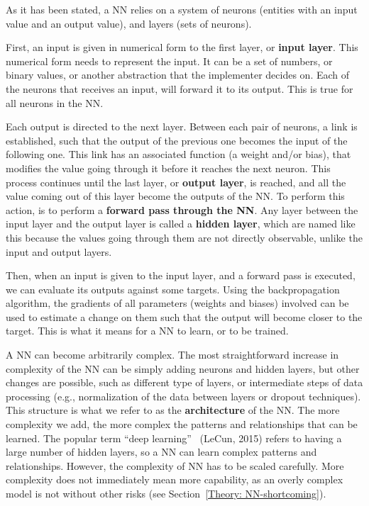 \documentclass[a4paper, 11pt]{report}
\begin{document}
As it has been stated, a NN relies on a system of neurons (entities with an input value and an output value), and layers (sets of neurons).

First, an input is given in numerical form to the first layer, or \textbf{input layer}. This numerical form needs to represent the input. It can be a set of numbers, or binary values, or another abstraction that the implementer decides on. Each of the neurons that receives an input, will forward it to its output. This is true for all neurons in the NN.

Each output is directed to the next layer. Between each pair of neurons, a link is established, such that the output of the previous one becomes the input of the following one. This link has an associated function (a weight and/or bias), that modifies the value going through it before it reaches the next neuron. This process continues until the last layer, or \textbf{output layer}, is reached, and all the value coming out of this layer become the outputs of the NN. To perform this action, is to perform a \textbf{forward pass through the NN}. Any layer between the input layer and the output layer is called a \textbf{hidden layer}, which are named like this because the values going through them are not directly observable, unlike the input and output layers.

Then, when an input is given to the input layer, and a forward pass is executed, we can evaluate its outputs against some targets. Using the backpropagation algorithm, the gradients of all parameters (weights and biases) involved can be used to estimate a change on them such that the output will become closer to the target. This is what it means for a NN to learn, or to be trained.

A NN can become arbitrarily complex. The most straightforward increase in complexity of the NN can be simply adding neurons and hidden layers, but other changes are possible, such as different type of layers, or intermediate steps of data processing (e.g., normalization of the data between layers or dropout techniques). This structure is what we refer to as the \textbf{architecture} of the NN. The more complexity we add, the more complex the patterns and relationships that can be learned. The popular term ``deep learning''~\cite{LeCun2015_DeepLearning} (LeCun, 2015) refers to having a large number of hidden layers, so a NN can learn complex patterns and relationships. However, the complexity of NN has to be scaled carefully. More complexity does not immediately mean more capability, as an overly complex model is not without other risks (see Section~\ref{Theory: NN-shortcoming}).
\end{document}
